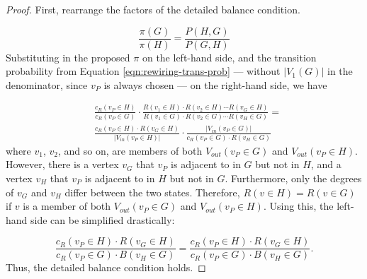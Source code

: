 \documentclass[a4paper,10pt]{article}
\begin{document}
\begin{proof}
First, rearrange the factors of the detailed balance condition. 

\begin{equation}
 \frac{\pi(G)}{\pi(H)} = \frac{P(H, G)}{P(G, H)}
\end{equation}
Substituting in the proposed $\pi$ on the left-hand side, and the transition probability from Equation \ref{eqn:rewiring-trans-prob} --- without $|V_1(G)|$ in the denominator, since $v_P$ is always chosen --- on the right-hand side, we have

\begin{equation}
\begin{split}
&\frac{c_R(v_P \in H)}{c_R(v_P \in G)} \cdot\frac{R(v_1 \in H) \cdot R(v_2 \in H) \cdots R(v_G \in H)}
{R(v_1 \in G) \cdot R(v_2 \in G) \cdots R(v_H \in G)} = \\
 &\frac{c_R(v_P \in H) \cdot R(v_G \in H)}{|V_{in}(v_P \in H)|} \cdot \frac{|V_{in}(v_P \in G)|}{c_R(v_P \in G) \cdot R(v_H \in G)} 
\end{split} 
\end{equation}
where $v_1$, $v_2$, and so on, are members of both $V_{out}(v_P \in G)$ and $V_{out}(v_P \in H)$. However, there is a vertex $v_G$ that $v_P$ is adjacent to in $G$ but not in $H$, and a vertex $v_H$ that $v_P$ is adjacent to in $H$ but not in $G$. Furthermore, only the degrees of $v_G$ and $v_H$ differ between the two states. Therefore, $R(v \in H) = R(v \in G)$ if $v$ is a member of both $V_{out}(v_P \in G)$ and $V_{out}(v_P \in H)$. Using this, the left-hand side can be simplified drastically:

\begin{equation}
 \frac{c_R(v_P \in H) \cdot R(v_G \in H)}{c_R(v_P \in G) \cdot B(v_H \in G)} = 
 \frac{c_R(v_P \in H) \cdot R(v_G \in H)}{c_R(v_P \in G) \cdot B(v_H \in G)}.
\end{equation}
Thus, the detailed balance condition holds.

\end{proof}
\end{document}
